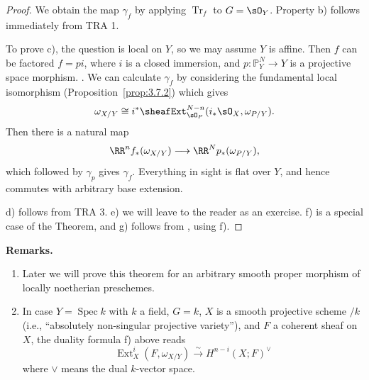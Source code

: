 \begin{proof}
We obtain the map $\gamma_f$ by applying $\operatorname{Tr}_f$ to $G=\sO_Y$. Property b) follows immediately from TRA 1.

To prove c), the question is local on $Y$, so we may assume $Y$ is affine. Then $f$ can be factored $f=pi$, where $i$ is a closed immersion, and $p\colon\mathbb{P}_Y^N\to Y$ is a projective space morphism. \cite[\nopp II,~5.5.4]{EGA}. We can calculate $\gamma_f$ by considering the fundamental local isomorphism (Proposition~\ref{prop:3.7.2}) which gives
\[
\omega_{X/Y} \cong i^* \sheafExt_{\sO_P}^{N-n}(i_*\sO_X, \omega_{P/Y}).
\]
Then there is a natural map
\[
\RR^n f_*(\omega_{X/Y}) \longrightarrow \RR^N p_*(\omega_{P/Y}),
\]
which followed by $\gamma_p$ gives $\gamma_f$. Everything in sight is flat over $Y$, and hence commutes with arbitrary base extension.

d) follows from TRA 3.
e) we will leave to the reader as an exercise.
f) is a special case of the Theorem, and
g) follows from \cite[\nopp III,~4.3.1]{EGA}, using f).
\end{proof}

\textbf{Remarks.}
\begin{enumerate}
\item Later we will prove this theorem for an arbitrary smooth proper morphism of locally noetherian preschemes.
\item In case $Y=\operatorname{Spec}k$ with $k$ a field, $G=k$, $X$ is a smooth projective scheme $/k$ (i.e., ``absolutely non-singular projective variety''), and $F$ a coherent sheaf on $X$, the duality formula f) above reads
\[
\operatorname{Ext}_X^i(F, \omega_{X/Y}) \xrightarrow{\sim} H^{n-i}(X;F)^{\vee}
\]
where $\vee$ means the dual $k$-vector space.
\end{enumerate}
\par
\endgroup
